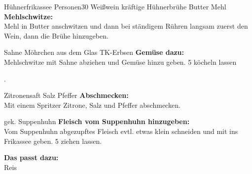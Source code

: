 \begin{MyRecipe}{Hühnerfrikassee}{ Personen}{\SI{30}{\minuteprime}}
\ingredient[\Calc{0.1}{\x}]{\si{\liter}} {Weißwein}
\ingredient[\Calc{0.3}{\x}]{\si{\liter}} {kräftige Hühnerbrühe}
\ingredient[\Calc{25}{\x}]{\si{\gram}} {Butter}
\ingredient[\Calc{25}{\x}]{\si{\gram}} {Mehl}
\textbf{Mehlschwitze:}\\
Mehl in Butter anschwitzen und dann bei ständigem Rühren langsam zuerst den Wein, dann die Brühe hinzugeben.\par\bigskip

\ingredient[\Calc{0.1}{\x}]{\si{\milli\liter}} {Sahne}
\ingredient[\Calc{0.15}{\x}]{\si{\gram}} {Möhrchen aus dem Glas}
\ingredient[\Calc{0.15}{\x}]{\si{\gram}} {TK-Erbsen}
\textbf{Gemüse dazu:}\\
Mehlschwitze mit Sahne abziehen und Gemüse hinzu geben. \SI{5}{\minuteprime} köcheln lassen\par\bigskip.

 {Zitronensaft}
\ingredient[]{} {Salz}
\ingredient[]{} {Pfeffer}
\textbf{Abschmecken:}\\
Mit einem Spritzer Zitrone, Salz und Pfeffer abschmecken.\par\bigskip

\ingredient[]{} {gek. Suppenhuhn}
\textbf{Fleisch vom Suppenhuhn hinzugeben:}\\
Vom Suppenhuhn abgezupftes Fleisch evtl. etwas klein schneiden und mit ins Frikassee geben. \SI{5}{\minuteprime} ziehen lassen.\par\bigskip

\textbf{Das passt dazu:}\\
Reis

\end{MyRecipe}